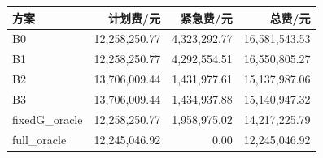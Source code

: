 \begin{tabular}{lrrr}
\toprule
方案 & 计划费/元 & 紧急费/元 & 总费/元 \\
\midrule
B0 & 12,258,250.77 & 4,323,292.77 & 16,581,543.53 \\
B1 & 12,258,250.77 & 4,292,554.51 & 16,550,805.27 \\
B2 & 13,706,009.44 & 1,431,977.61 & 15,137,987.06 \\
B3 & 13,706,009.44 & 1,434,937.88 & 15,140,947.32 \\
fixedG\_oracle & 12,258,250.77 & 1,958,975.02 & 14,217,225.79 \\
full\_oracle & 12,245,046.92 & 0.00 & 12,245,046.92 \\
\bottomrule
\end{tabular}
